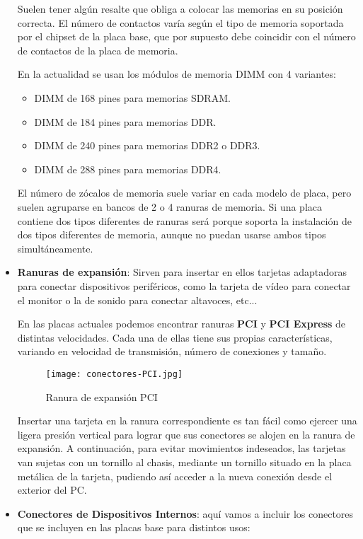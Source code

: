 \begin{itemize}
    Suelen tener algún resalte que obliga a colocar las memorias en su posición correcta. El número de contactos varía según el tipo de memoria soportada por el chipset de la placa base, que por supuesto debe coincidir con el número de contactos de la placa de memoria.

    En la actualidad se usan los módulos de memoria DIMM con 4 variantes:
    \begin{itemize}
        \item DIMM de 168 pines para memorias SDRAM.
        \item DIMM de 184 pines para memorias DDR.
        \item DIMM de 240 pines para memorias DDR2 o DDR3.
        \item DIMM de 288 pines para memorias DDR4.
    \end{itemize}

    El número de zócalos de memoria suele variar en cada modelo de placa, pero suelen agruparse en bancos de 2 o 4 ranuras de memoria. Si una placa contiene dos tipos diferentes de ranuras será porque soporta la instalación de dos tipos diferentes de memoria, aunque no puedan usarse ambos tipos simultáneamente.

    \item \textbf{Ranuras de expansión}: Sirven para insertar en ellos tarjetas adaptadoras para conectar dispositivos periféricos, como la tarjeta de vídeo para conectar el monitor o la de sonido para conectar altavoces, etc...

    En las placas actuales podemos encontrar ranuras \textbf{PCI} y \textbf{PCI Express} de distintas velocidades. Cada una de ellas tiene sus propias características, variando en velocidad de transmisión, número de conexiones y tamaño.

     \begin{figure}[ht]
        \centering
        \texttt{[image: conectores-PCI.jpg]}
        \caption{Ranura de expansión PCI}
    \end{figure}

    Insertar una tarjeta en la ranura correspondiente es tan fácil como ejercer una ligera presión vertical para lograr que sus conectores se alojen en la ranura de expansión. A continuación, para evitar movimientos indeseados, las tarjetas van sujetas con un tornillo al chasis, mediante un tornillo situado en la placa metálica de la tarjeta, pudiendo así acceder a la nueva conexión desde el exterior del PC.

    \item \textbf{Conectores de Dispositivos Internos}: aquí vamos a incluir los conectores que se incluyen en las placas base para distintos usos:


\end{itemize}
